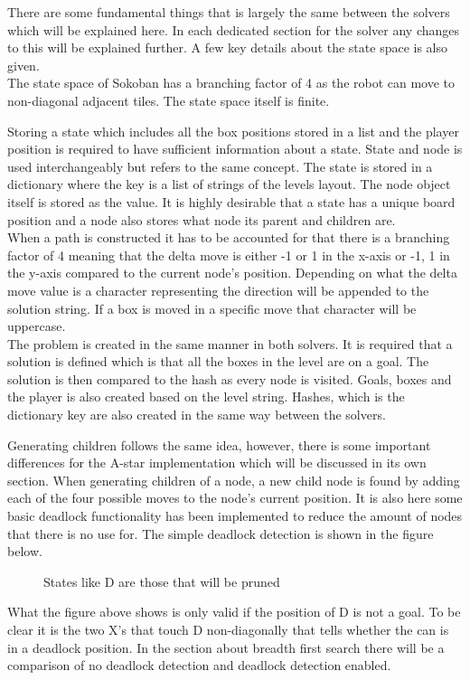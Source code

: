 \documentclass[../../main.tex]{subfiles}
\begin{document}
There are some fundamental things that is largely the same between the solvers which will be explained here. In each dedicated section for the solver any changes to this will be explained further. A few key details about the state space is also given. \\

The state space of Sokoban has a branching factor of 4 as the robot can move to non-diagonal adjacent tiles. The state space itself is finite.

Storing a state which includes all the box positions stored in a list and the player position is required to have 				sufficient 	information about a state. State and node is used interchangeably but refers to the same concept. The state is stored in a dictionary where the key is a list of strings of the levels layout. The node object itself is stored as the value. It is highly desirable that a state has a unique board position and a node also stores what node its parent and children are. \\

When a path is constructed it has to be accounted for that there is a branching factor of 4 meaning that the delta move is either -1 or 1 in the x-axis or -1, 1 in the y-axis compared to the current node's position. Depending on what the delta move value is a character representing the direction will be appended to the solution string. If a box is moved in a specific move that character will be uppercase. \\

The problem is created in the same manner in both solvers. It is required that a solution is defined which is that all the boxes in the level are on a goal. The solution is then compared to the hash as every node is visited. Goals, boxes and the player is also created based on the level string. Hashes, which is the dictionary key are also created in the same way between the solvers. 

Generating children follows the same idea, however, there is some important differences for the A-star implementation which will be discussed in its own section. When generating children of a node, a new child node is found by adding each of the four possible moves to the node's current position. It is also here some basic deadlock functionality has been implemented to reduce the amount of nodes that there is no use for. The simple deadlock detection is shown in the figure below.

\begin{figure}[h]
	\centering

	\caption{States like D are those that will be pruned}
	\label{fig:basic_deadlock_detection}
\end{figure}

What the figure above shows is only valid if the position of D is not a goal. To be clear it is the two X's that touch D non-diagonally that tells whether the can is in a deadlock position. In the section about breadth first search there will be a comparison of no deadlock detection and deadlock detection enabled.
\end{document}
